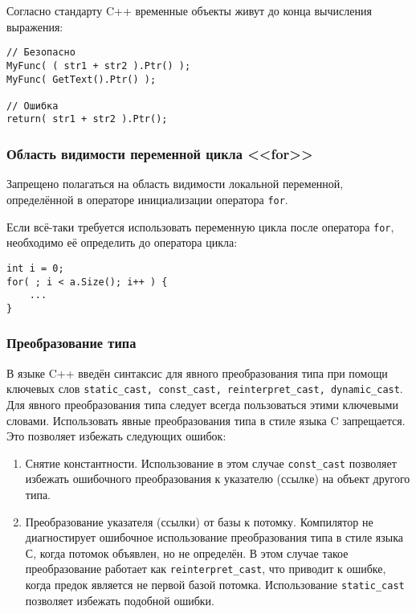 {{{Согласно стандарту C++ временные объекты живут до конца вычисления выражения:

\begin{lstlisting}[frame=single]
// Безопасно
MyFunc( ( str1 + str2 ).Ptr() );
MyFunc( GetText().Ptr() );

// Ошибка
return( str1 + str2 ).Ptr();
\end{lstlisting}

\newpage
\subsubsection{Область видимости переменной цикла <<for>>}

Запрещено полагаться на область видимости локальной переменной, определённой в операторе инициализации оператора \lstinline|for|.

Если всё-таки требуется использовать переменную цикла после оператора \lstinline|for|, необходимо её определить до оператора цикла:

\begin{lstlisting}[frame=single]
int i = 0;
for( ; i < a.Size(); i++ ) {
	...
}
\end{lstlisting}

\subsubsection{Преобразование типа}

В языке C++ введён синтаксис для явного преобразования типа при помощи ключевых слов \lstinline|static_cast, const_cast, reinterpret_cast, dynamic_cast|. Для явного преобразования типа следует всегда пользоваться этими ключевыми словами. Использовать явные преобразования типа в стиле языка C запрещается. Это позволяет избежать следующих ошибок:

\begin{enumerate}
\item Снятие константности. Использование в этом случае \lstinline|const_cast| позволяет избежать ошибочного преобразования к указателю (ссылке) на объект другого типа.
\item Преобразование указателя (ссылки) от базы к потомку. Компилятор не диагностирует ошибочное использование преобразования типа в стиле языка С, когда потомок объявлен, но не определён. В этом случае такое преобразование работает как \lstinline|reinterpret_cast|, что приводит к ошибке, когда предок является не первой базой потомка. Использование \lstinline|static_cast| позволяет избежать подобной ошибки. 
\end{enumerate}

}}}

